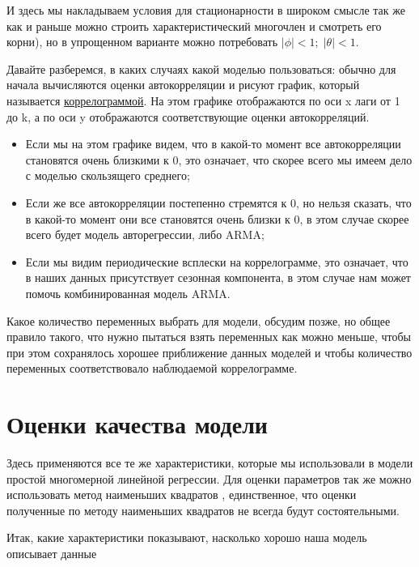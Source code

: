 \documentclass{article}
\begin{document}
И здесь мы накладываем условия для стационарности в широком смысле так же как и раньше можно строить характеристический многочлен и смотреть его корни), но в упрощенном варианте можно потребовать $|\phi| < 1; \; |\theta| < 1$.

Давайте разберемся, в каких случаях какой моделью пользоваться: обычно для начала вычисляются оценки автокорреляции и рисуют график, который называется \underline{коррелограммой}. На этом графике отображаются по оси x лаги от 1 до k, а по оси y отображаются соответствующие оценки автокорреляций.

\begin{itemize}
    \item Если мы на этом графике видем, что в какой-то момент все автокорреляции становятся очень близкими к 0, это означает, что скорее всего мы имеем дело с моделью скользящего среднего;
    \item  Если же все автокорреляции постепенно стремятся к 0, но нельзя сказать, что в какой-то момент они все становятся очень близки к 0, в этом случае скорее всего будет модель авторегрессии, либо ARMA;
    \item Если мы видим периодические всплески на коррелограмме, это означает, что в наших данных присутствует сезонная компонента, в этом случае нам может помочь комбинированная модель ARMA.
\end{itemize}

Какое количество переменных выбрать для модели, обсудим позже, но общее правило такого, что нужно пытаться взять переменных как можно меньше, чтобы при этом сохранялось хорошее приближение данных моделей и чтобы количество переменных соответствовало наблюдаемой коррелограмме.  

\section{Оценки качества модели}

Здесь применяются все те же характеристики, которые мы использовали в модели простой многомерной линейной регрессии. Для оценки параметров так же можно использовать метод наименьших квадратов , единственное, что оценки полученные по методу наименьших квадратов не всегда будут состоятельными. 

Итак, какие характеристики показывают, насколько хорошо наша модель описывает данные 
\end{document}
